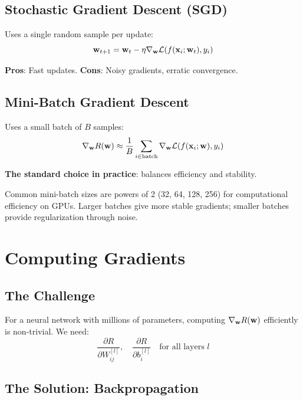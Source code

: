 \subsection{Stochastic Gradient Descent (SGD)}

Uses a single random sample per update:
\[
\mathbf{w}_{t+1} = \mathbf{w}_t - \eta \nabla_{\mathbf{w}} \mathcal{L}(f(\mathbf{x}_i; \mathbf{w}_t), y_i)
\]

\textbf{Pros}: Fast updates. \textbf{Cons}: Noisy gradients, erratic convergence.

\subsection{Mini-Batch Gradient Descent}

Uses a small batch of $B$ samples:
\[
\nabla_{\mathbf{w}} R(\mathbf{w}) \approx \frac{1}{B} \sum_{i \in \text{batch}} \nabla_{\mathbf{w}} \mathcal{L}(f(\mathbf{x}_i; \mathbf{w}), y_i)
\]

\textbf{The standard choice in practice}: balances efficiency and stability.

\begin{bluebox}
Common mini-batch sizes are powers of 2 (32, 64, 128, 256) for computational efficiency on GPUs. Larger batches give more stable gradients; smaller batches provide regularization through noise.
\end{bluebox}


\section{Computing Gradients}

\subsection{The Challenge}

For a neural network with millions of parameters, computing $\nabla_{\mathbf{w}} R(\mathbf{w})$ efficiently is non-trivial. We need:
\[
\frac{\partial R}{\partial W_{ij}^{[l]}}, \quad \frac{\partial R}{\partial b_i^{[l]}} \quad \text{for all layers } l
\]

\subsection{The Solution: Backpropagation}

